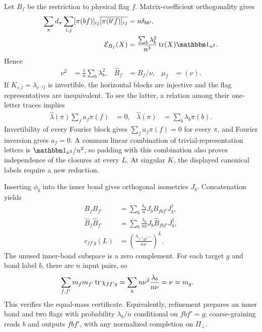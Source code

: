 Let $B_f$ be the restriction to physical flag $f$. Matrix-coefficient
orthogonality gives
\begin{align}
	\sum_\pi d_\pi\sum_{i,j}
	              [\pi(bf)]_{ij}\overline{[\pi(b'f)]_{ij}}
	 & =n\delta_{bb'},                                \\
	\mc E_{B_f}(X)
	 & =\frac{\sum_b\lambda_b^2}{n^3}\tr(X)\Id_{n^2}.
\end{align}
Hence
\begin{align}
	\nu^2        & =\frac1n\sum_b\lambda_b^2, &
	\widehat B_f & =B_f/\nu,                  &
	\mu_f        & =(\nu).
\end{align}
If $K_{c,l}=\lambda_{c^{-1}l}$ is invertible, the horizontal
blocks are injective and the flag representatives are inequivalent.
To see the latter, a relation among their one-letter traces implies
\begin{align}
	\widehat\lambda(\pi)\sum_fa_f\pi(f) & =0,
	                                    &
	\widehat\lambda(\pi)                & =\sum_b\lambda_b\pi(b).
\end{align}
Invertibility of every Fourier block gives
$\sum_fa_f\pi(f)=0$ for every $\pi$, and Fourier inversion gives
$a_f=0$. A common linear combination of trivial-representation
letters is $\Id_{n^2}/n^2$, so padding with this combination
also proves independence of the closures at every $L$.
At singular $K$, the displayed canonical labels require a new
reduction.

Inserting $\phi_b$ into the inner bond gives orthogonal isometries
$J_b$. Concatenation yields
\begin{align}
	B_fB_{f'}
	 & =\sum_b\frac{\lambda_b}{n}J_bB_{fbf'}J_b^\dagger,      \\
	\widehat B_f\widehat B_{f'}
	 & =\sum_b\frac{\lambda_b}{n\nu}
	J_b\widehat B_{fbf'}J_b^\dagger,                          \\
	c_{ff'g}(L)
	 & =\left(\frac{\lambda_{f^{-1}gf'^{-1}}}{n\nu}\right)^L.
	\label{eq:group-fusion}
\end{align}
The unused inner-bond subspace is a zero complement. For each
target $g$ and bond label $b$, there are $n$ input pairs, so
\begin{align}
	\sum_{f,f'}m_fm_{f'}\operatorname{tr}\chi_{ff'g}
	 & =\sum_b n\nu^2\frac{\lambda_b}{n\nu}
	=\nu=m_g.
\end{align}
This verifies the equal-mass certificate. Equivalently, refinement
prepares an inner bond and two flags with probability $\lambda_b/n$
conditional on $fbf'=g$; coarse-graining reads $b$ and outputs
$fbf'$, with any normalized completion on $\Pi_\perp$.

